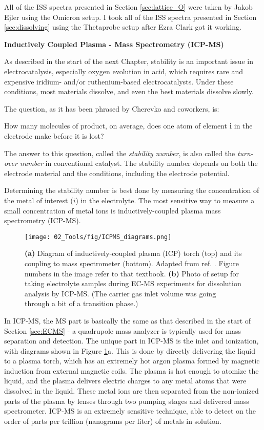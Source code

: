 All of the ISS spectra presented in Section \ref{sec:lattice_O} were taken by Jakob Ejler using the Omicron setup. I took all of the ISS spectra presented in Section \ref{sec:dissolving} using the Thetaprobe setup after Ezra Clark got it working.


\textbf{Inductively Coupled Plasma - Mass Spectrometry (ICP-MS)}

As described in the start of the next Chapter, stability is an important issue in electrocatalysis, especially oxygen evolution in acid, which requires rare and expensive iridium- and/or ruthenium-based electrocatalysts. Under these conditions, most materials dissolve, and even the best materials dissolve slowly.

The question, as it has been phrased by Cherevko and coworkers\cite{Geiger2018}, is:
\begin{question}
	How many molecules of product, on average, does one atom of element \textbf{i} in the electrode make before it is lost?
\end{question}
The answer to this question, called the \textit{stability number}, is also called the \textit{turn-over number} in conventional catalyst. The stability number depends on both the electrode material and the conditions, including the electrode potential.

Determining the stability number is best done by measuring the concentration of the metal of interest ($i$) in the electrolyte. The most sensitive way to measure a small concentration of metal ions is inductively-coupled plasma mass spectrometry (ICP-MS)\cite{Harris2010, Frydendal2014}.
\begin{figure}[h!]
	\centering
	\texttt{[image: 02\_Tools/fig/ICPMS\_diagrams.png]}
	\caption{\textbf{(a)} Diagram of inductively-coupled plasma (ICP) torch (top) and its coupling to mass spectrometer (bottom). Adapted from ref. . Figure numbers in the image refer to that textbook. \textbf{(b)} Photo of setup for taking electrolyte samples during EC-MS experiments for dissolution analysis by ICP-MS. (The carrier gas inlet volume was going through a bit of a transition phase.) }
	\label{fig:ICPMS}
\end{figure}
In ICP-MS, the MS part is basically the same as that described in the start of Section \ref{sec:ECMS} - a quadrupole mass analyzer is typically used for mass separation and detection. The unique part in ICP-MS is the inlet and ionization\cite{Gross2007}, with diagrams shown in Figure \ref{fig:ICPMS}a. This is done by directly delivering the liquid to a plasma torch, which has an extremely hot argon plasma formed by magnetic induction from external magnetic coils. The plasma is hot enough to atomize the liquid, and the plasma delivers electric charges to any metal atoms that were dissolved in the liquid. These metal ions are then separated from the non-ionized parts of the plasma by lenses through two pumping stages and delivered mass spectrometer. ICP-MS is an extremely sensitive technique, able to detect on the order of parts per trillion (nanograms per liter) of metals in solution.

